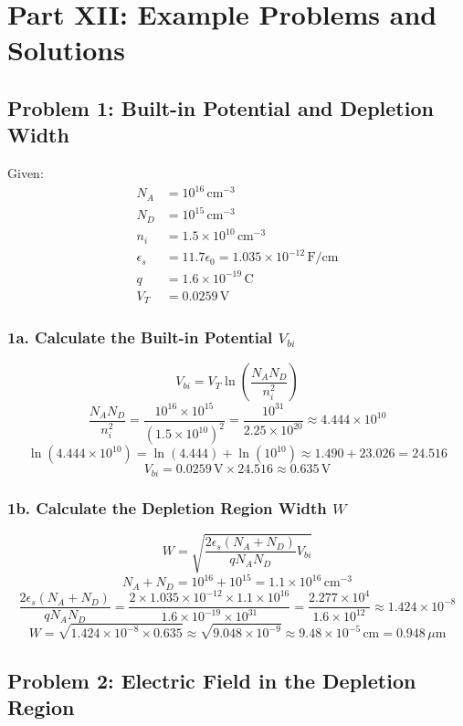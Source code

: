 \documentclass[12pt]{article}
\begin{document}
\section{Part XII: Example Problems and Solutions}

\subsection{Problem 1: Built-in Potential and Depletion Width}
Given:
\begin{align*}
N_A &= 10^{16}\, \text{cm}^{-3} \\
N_D &= 10^{15}\, \text{cm}^{-3} \\
n_i &= 1.5 \times 10^{10}\, \text{cm}^{-3} \\
\epsilon_s &= 11.7 \epsilon_0 = 1.035 \times 10^{-12}\, \text{F/cm} \\
q &= 1.6 \times 10^{-19}\, \text{C} \\
V_T &= 0.0259\, \text{V}
\end{align*}

\subsubsection{1a. Calculate the Built-in Potential \( V_{bi} \)}
\[
V_{bi} = V_T \ln\left(\frac{N_A N_D}{n_i^2}\right)
\]
\[
\frac{N_A N_D}{n_i^2} = \frac{10^{16} \times 10^{15}}{(1.5 \times 10^{10})^2} = \frac{10^{31}}{2.25 \times 10^{20}} \approx 4.444 \times 10^{10}
\]
\[
\ln(4.444 \times 10^{10}) = \ln(4.444) + \ln(10^{10}) \approx 1.490 + 23.026 = 24.516
\]
\[
V_{bi} = 0.0259\, \text{V} \times 24.516 \approx 0.635\, \text{V}
\]

\subsubsection{1b. Calculate the Depletion Region Width \( W \)}
\[
W = \sqrt{\frac{2\epsilon_s (N_A + N_D)}{q N_A N_D} V_{bi}}
\]
\[
N_A + N_D = 10^{16} + 10^{15} = 1.1 \times 10^{16}\, \text{cm}^{-3}
\]
\[
\frac{2\epsilon_s (N_A + N_D)}{q N_A N_D} = \frac{2 \times 1.035 \times 10^{-12} \times 1.1 \times 10^{16}}{1.6 \times 10^{-19} \times 10^{31}} = \frac{2.277 \times 10^{4}}{1.6 \times 10^{12}} \approx 1.424 \times 10^{-8}
\]
\[
W = \sqrt{1.424 \times 10^{-8} \times 0.635} \approx \sqrt{9.048 \times 10^{-9}} \approx 9.48 \times 10^{-5}\, \text{cm} = 0.948\, \mu\text{m}
\]

\subsection{Problem 2: Electric Field in the Depletion Region}
\end{document}
